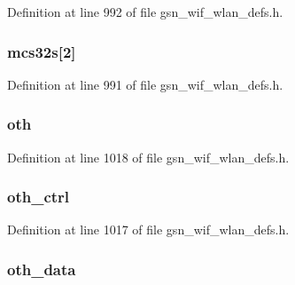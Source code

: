Definition at line 992 of file gsn\_\-wif\_\-wlan\_\-defs.h.

\hypertarget{a00398_af6ac2ed83df90516d588a62afe6df20f}{
\subsubsection[{mcs32s}]{ {\bf mcs32s}\mbox{[}2\mbox{]}}}
\label{a00398_af6ac2ed83df90516d588a62afe6df20f}


Definition at line 991 of file gsn\_\-wif\_\-wlan\_\-defs.h.

\hypertarget{a00398_aba1f71ef75513044ac20c228b28cb956}{
\subsubsection[{oth}]{ {\bf oth}}}
\label{a00398_aba1f71ef75513044ac20c228b28cb956}


Definition at line 1018 of file gsn\_\-wif\_\-wlan\_\-defs.h.

\hypertarget{a00398_a7247d8d5dda9d44a5a35d9ce5af66f8f}{
\subsubsection[{oth\_\-ctrl}]{ {\bf oth\_\-ctrl}}}
\label{a00398_a7247d8d5dda9d44a5a35d9ce5af66f8f}


Definition at line 1017 of file gsn\_\-wif\_\-wlan\_\-defs.h.

\hypertarget{a00398_a2352cd150176a0d80001ea39726af681}{
\subsubsection[{oth\_\-data}]{ {\bf oth\_\-data}}}
\label{a00398_a2352cd150176a0d80001ea39726af681}


